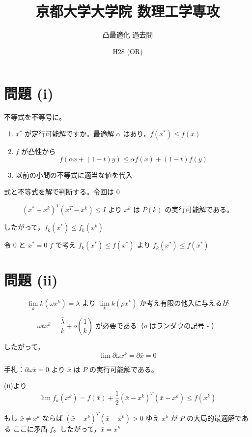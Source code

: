 \documentclass[12pt,a4paper]{article}
\title{京都大学大学院 数理工学専攻}
\author{凸最適化 過去問}
\date{H28 (OR)}
\begin{document}
\maketitle

\section*{問題 (i)}

不等式を不等号に。

\begin{enumerate}
  \item[\textcircled{1}] $x^*$ が定行可能解ですか。最適解 $\alpha$ はあり，$f(x^*) \leq f(x)$
  
  \item[\textcircled{2}] $f$ が凸性から 
  \[f(\alpha x + (1-t)y) \leq \alpha f(x) + (1-t)f(y)\]
  
  \item[\textcircled{3}] 以前の小問の不等式に適当な値を代入
\end{enumerate}

式と不等式を解で判断する。令回は $0$

\[(x^* - x^k)^T(x^T - x^k) \leq I \text{ より } x^k \text{ は } P(k) \text{ の実行可能解である。}\]

したがって，$f_k(x^*) \leq f_k(x^k)$

令 $0$ と $x^* = 0$ $f$ で考え $f_k(x^*) \leq f(x^*)$ より $f_k(x^*) \leq f(x^*)$

\section*{問題 (ii)}

\[\lim_k k(\omega x^k) = \bar{\lambda} \text{ より } \lim_k k(\rho x^k) \text{ か考え有限の他入に与えるが}\]

\[\omega t x^k = \frac{\bar{\lambda}}{k} + o\left(\frac{1}{k}\right) \text{ が必要である（$o$ はランダウの記号 - ）}\]

したがって，
\[\lim \partial \omega x^k = \partial \bar{x} = 0\]

手札：$\partial \omega \bar{x} = 0$ より $\bar{x}$ は $P$ の実行可能解である。

(ii)より 
\[\lim f_u(x^k) = f(\bar{x}) + \frac{1}{2}(\bar{x} - x^k)^T(\bar{x} - x^k) \leq f(x^k)\]

もし $\bar{x} \neq x^k$ ならば $(\bar{x} - x^k)^T(\bar{x} - x^k) > 0$ ゆえ $x^k$ が $P$ の大局的最適解である
ここに矛盾 $f$。したがって，$\bar{x} = x^k$
\end{document}

